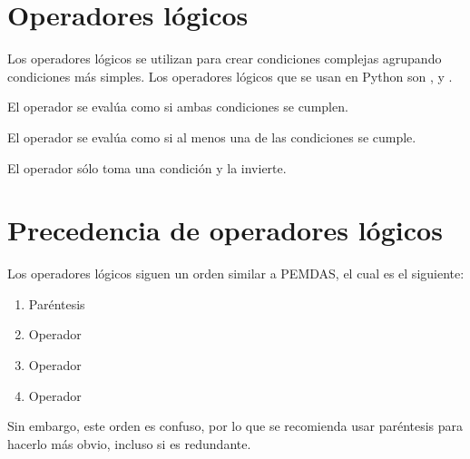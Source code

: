 \section{Operadores lógicos}

Los operadores lógicos se utilizan para crear condiciones complejas agrupando condiciones más simples. Los operadores lógicos que se usan en Python son ,  y .\smallskip

El operador  se evalúa como  si ambas condiciones se cumplen.


El operador  se evalúa como  si al menos una de las condiciones se cumple.


El operador  sólo toma una condición y la invierte.


\section{Precedencia de operadores lógicos}

Los operadores lógicos siguen un orden similar a PEMDAS, el cual es el siguiente:

\begin{enumerate}
  \item Paréntesis \ttt{()}
  
  \item Operador 
  
  \item Operador 
  
  \item Operador 
  
\end{enumerate}

Sin embargo, este orden es confuso, por lo que se recomienda usar paréntesis para hacerlo más obvio, incluso si es redundante.


\clearpage